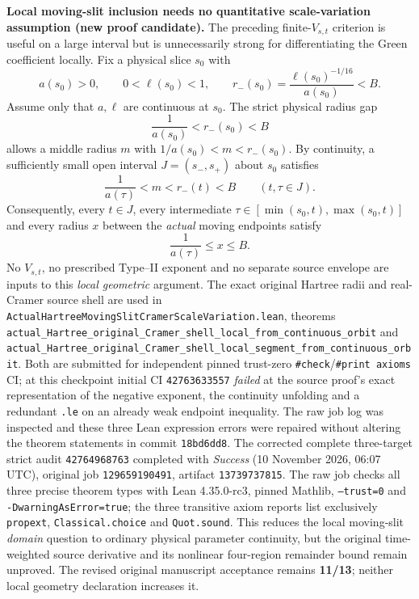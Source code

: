 \documentclass[11pt]{amsart}
\begin{document}
\medskip
\noindent\textbf{Local moving-slit inclusion needs no quantitative
scale-variation assumption (new proof candidate).}
The preceding finite-$V_{s,t}$ criterion is useful on a large interval
but is unnecessarily strong for differentiating the Green coefficient
locally. Fix a physical slice $s_0$ with
\[
 a(s_0)>0,\qquad 0<\ell(s_0)<1,\qquad
 r_-(s_0)=\frac{\ell(s_0)^{-1/16}}{a(s_0)}<B.
\]
Assume only that $a,\ell$ are continuous at $s_0$.
The strict physical radius gap
\[
 \frac{1}{a(s_0)}<r_-(s_0)<B
\]
allows a middle radius $m$ with
$1/a(s_0)<m<r_-(s_0)$. By continuity, a sufficiently
small open interval $J=(s_-,s_+)$ about $s_0$ satisfies
\[
 \frac{1}{a(\tau)}<m<r_-(t)<B
 \qquad (t,\tau\in J).
\]
Consequently, every $t\in J$, every intermediate
$\tau\in[\min(s_0,t),\max(s_0,t)]$ and every radius
$x$ between the \emph{actual} moving endpoints satisfy
\[
 \boxed{\quad \frac{1}{a(\tau)}
 \le x\le B.\quad}
\]
No $V_{s,t}$, no prescribed Type--II exponent and no separate
source envelope are inputs to this \emph{local geometric} argument.
The exact original Hartree radii and real-Cramer source shell
are used in
\texttt{ActualHartreeMovingSlitCramerScaleVariation.lean},
theorems
\texttt{actual\_Hartree\_original\_Cramer\_shell\_local\_from\_continuous\_orbit}
and
\texttt{actual\_Hartree\_original\_Cramer\_shell\_local\_segment\_from\_continuous\_orbit}.
Both are submitted for independent pinned trust-zero
\texttt{\#check}/\texttt{\#print axioms} CI; at this checkpoint
initial CI \texttt{42763633557} \emph{failed} at the source
proof's exact representation of the negative exponent, the
continuity unfolding and a redundant \texttt{.le} on an already
weak endpoint inequality. The raw job log was inspected and
these three Lean expression errors were repaired without altering
the theorem statements in commit \texttt{18bd6dd8}.
The corrected complete three-target strict audit
\texttt{42764968763} completed with \emph{Success}
(10 November 2026, 06:07 UTC), original job
\texttt{129659190491}, artifact \texttt{13739737815}.
The raw job checks all three precise theorem types with
Lean 4.35.0-rc3, pinned Mathlib, \texttt{--trust=0}
and \texttt{-DwarningAsError=true}; the three transitive
axiom reports list exclusively \texttt{propext},
\texttt{Classical.choice} and \texttt{Quot.sound}. This reduces the local moving-slit \emph{domain} question
to ordinary physical parameter continuity, but the
original time-weighted source derivative and its
nonlinear four-region remainder bound remain unproved.
The revised original manuscript acceptance remains
\textbf{11/13}; neither local geometry declaration increases it.
\end{document}
